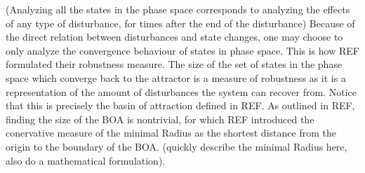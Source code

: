 



    (Analyzing all the states in the phase space corresponds to analyzing the effects of any type of disturbance, for times after the end of the disturbance)
    Because of the direct relation between disturbances and state changes, one may choose to only analyze the convergence behaviour of states in phase space. This is how REF formulated their robustness measure. The size of the set of states in the phase space which converge back to the attractor is a measure of robustness as it is a representation of the amount of disturbances the system can recover from. Notice that this is precisely the basin of attraction defined in REF. As outlined in REF, finding the size of the BOA is nontrivial, for which REF introduced the conervative measure of the minimal Radius as the shortest distance from the origin to the boundary of the BOA. (quickly describe the minimal Radius here, also do a mathematical formulation).







